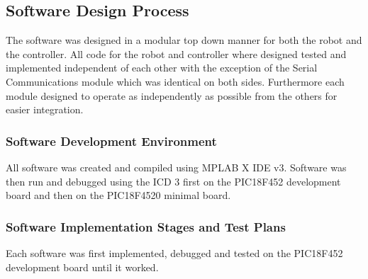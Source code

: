 \documentclass[MTRX3700report.tex]{subfiles}
\begin{document}
\subsection{Software Design Process}
The software was designed in a modular top down manner for both the robot and the controller. All code for the robot and controller where designed tested and implemented independent of each other with the exception of the Serial Communications module which was identical on both sides. Furthermore each module designed to operate as independently as possible from the others for easier integration.
\subsubsection{Software Development Environment}
All software was created and compiled using MPLAB X IDE v3.
Software was then run and debugged using  the ICD 3 first on the PIC18F452 development board and then on the PIC18F4520 minimal board.
\subsubsection{Software Implementation Stages and Test Plans}
Each software was first implemented, debugged and tested on the PIC18F452 development board until it worked.
\end{document}

